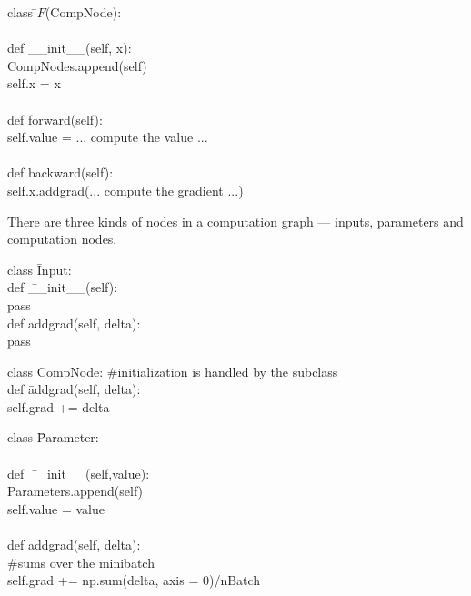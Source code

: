 {

\begin{tabbing}
  class \=$F$(CompNode): \\
  \\
    \>def \=\_\_init\_\_(self, x): \\
        \>\>CompNodes.append(self) \\
        \>\>self.x = x \\
\\
    \>def forward(self): \\
        \>\>self.value = ... compute the value ... \\
\\
    \>def backward(self): \\
        \>\>self.x.addgrad(... compute the gradient ...)
\end{tabbing}


There are three kinds of nodes in a computation graph --- inputs, parameters and computation nodes.

\vfill
\begin{tabbing}
class \=Input: \\
    \>def \=\_\_init\_\_(self): \\
        \>\>pass \\
    \>def \>addgrad(self, delta): \\
    \>\>pass
\end{tabbing}

\vfill
\begin{tabbing}
class \=CompNode: \#initialization is handled by the subclass \\
   \>def \=addgrad(self, delta): \\
   \>\>self.grad += delta
\end{tabbing}

\slide{}

\begin{tabbing}
class \=Parameter: \\
    \\
    \>def \=\_\_init\_\_(self,value): \\
        \>\>Parameters.append(self) \\
        \>\>self.value = value \\
\\
    \>def \>addgrad(self, delta): \\
          \>\>\#sums over the minibatch \\
    \>\>self.grad += np.sum(delta, axis = 0)/nBatch \\
\end{tabbing}

}
